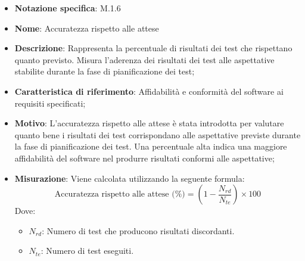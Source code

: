 \begin{itemize}
    \item \textbf{Notazione specifica}: M.1.6
    \item \textbf{Nome}: Accuratezza rispetto alle attese
    \item \textbf{Descrizione}: Rappresenta la percentuale di risultati dei test che rispettano quanto previsto. Misura l'aderenza dei risultati dei test alle aspettative stabilite durante la fase di pianificazione dei test;
    \item \textbf{Caratteristica di riferimento}: Affidabilità e conformità del software ai requisiti specificati;
    \item \textbf{Motivo}: L'accuratezza rispetto alle attese è stata introdotta per valutare quanto bene i risultati dei test corrispondano alle aspettative previste durante la fase di pianificazione dei test. Una percentuale alta indica una maggiore affidabilità del software nel produrre risultati conformi alle aspettative;
    \item \textbf{Misurazione}: Viene calcolata utilizzando la seguente formula:
    \[
    \text{Accuratezza rispetto alle attese (\%)} = \left(1 - \frac{N_{rd}}{N_{te}}\right) \times 100
    \]
    Dove:
    \begin{itemize}
        \item $N_{rd}$: Numero di test che producono risultati discordanti.
        \item $N_{te}$: Numero di test eseguiti.
    \end{itemize} 
\end{itemize}

